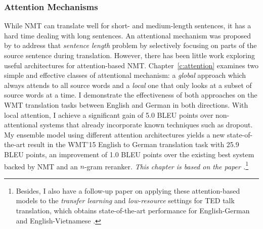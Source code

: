 \subsubsection{Attention Mechanisms} 
While NMT can translate well for short- and medium-length sentences, it 
has a hard time dealing with long sentences.
An attentional mechanism was proposed by  to address that {\it
sentence length} problem by
selectively focusing on parts of the source sentence during translation. However,
there has been little work exploring useful architectures for attention-based
NMT. Chapter~\ref{c:attention} examines two simple and effective classes of attentional
mechanism: a {\it global} approach which always attends to all source words and
a {\it local} one that only looks at a subset of source words at a time. 
I demonstrate the effectiveness of both approaches on the WMT translation
tasks between English and German in both directions. With local
attention, I achieve a significant gain of 5.0 BLEU points over
non-attentional systems that 
already incorporate known techniques such as dropout. My ensemble 
model using different attention architectures yields a new
state-of-the-art result in the WMT'15 English to German
translation task with 25.9 BLEU points, an improvement of 1.0 BLEU points over the existing
best system backed by NMT and an $n$-gram reranker. 
{\it This chapter is based
on the paper \cite{luong15attn}.}\footnote{ 
Besides, I also have a follow-up paper \cite{luong15iwslt} on applying these attention-based models to
the {\it transfer learning} and {\it low-resource} settings for TED talk translation, which obtains
state-of-the-art performance for English-German and English-Vietnamese \cite{iwslt15}.}

